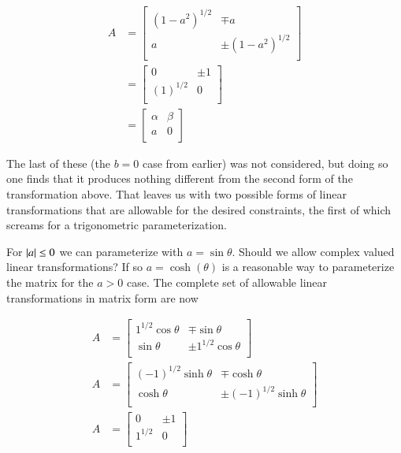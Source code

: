 \begin{align}\label{eqn:hamiltonian:voo17}
A 
&= 
\begin{bmatrix}
(1 - a^2)^{1/2} & \mp a \\
a  & \pm (1 - a^2)^{1/2} \\
\end{bmatrix} \\
&= 
\begin{bmatrix}
0 & \pm 1 \\
(1)^{1/2} & 0 \\
\end{bmatrix} \\
&=
\begin{bmatrix}
\alpha & \beta \\
a & 0 \\
\end{bmatrix} 
\end{align}

The last of these (the $b=0$ case from earlier) was not considered, but doing so one finds that it produces nothing different from the second form of the transformation above.  That leaves us with two possible forms of linear transformations that are allowable for the desired constraints, the first of which screams for a trigonometric parameterization.

For $\left\lvert{a}\right\rvert \le 0$ we can parameterize with $a = \sin\theta$.  Should we allow complex valued linear transformations?  If so $a = \cosh(\theta)$ is a reasonable way to parameterize the matrix for the $a > 0$ case.  The complete set of allowable linear transformations in matrix form are now

\begin{align}\label{eqn:hamiltonian:voo18}
A &= 
\begin{bmatrix}
1^{1/2} \cos\theta & \mp \sin\theta \\
\sin\theta & \pm 1^{1/2} \cos\theta \\
\end{bmatrix} \\
A &= 
\begin{bmatrix}
(-1)^{1/2} \sinh\theta & \mp \cosh\theta \\
\cosh\theta  & \pm (-1)^{1/2} \sinh\theta \\
\end{bmatrix} \\
A &= 
\begin{bmatrix}
0 & \pm 1 \\
1^{1/2} & 0 \\
\end{bmatrix}
\end{align}

